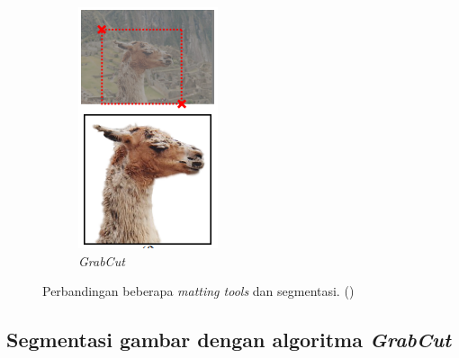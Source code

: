 \begin{figure}[H]
\begin{subfigure}{0.3\textwidth}
      \includegraphics[width=\textwidth]{gambar/gambar-2_5(f).png}
      \caption{\emph{GrabCut}}
    \end{subfigure}  
  \caption{
    Perbandingan beberapa \emph{matting tools} dan segmentasi. (\cite{Rother:2004})
    }
  \label{gambar:2.5}
\end{figure}


\subsection{{Segmentasi gambar dengan algoritma \emph{GrabCut}}}

